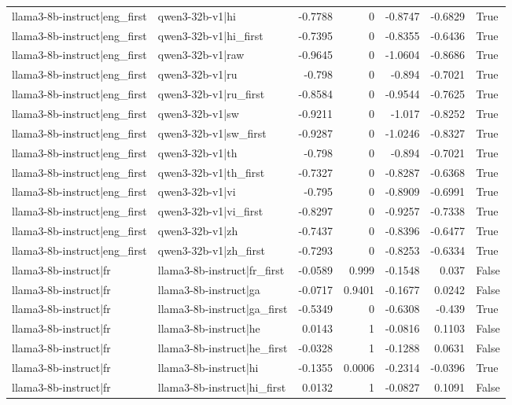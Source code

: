 \begin{table}
\begin{tabular}{l l r r r r l}
llama3-8b-instruct|eng_first & qwen3-32b-v1|hi & -0.7788 & 0 & -0.8747 & -0.6829 & True \\
llama3-8b-instruct|eng_first & qwen3-32b-v1|hi_first & -0.7395 & 0 & -0.8355 & -0.6436 & True \\
llama3-8b-instruct|eng_first & qwen3-32b-v1|raw & -0.9645 & 0 & -1.0604 & -0.8686 & True \\
llama3-8b-instruct|eng_first & qwen3-32b-v1|ru & -0.798 & 0 & -0.894 & -0.7021 & True \\
llama3-8b-instruct|eng_first & qwen3-32b-v1|ru_first & -0.8584 & 0 & -0.9544 & -0.7625 & True \\
llama3-8b-instruct|eng_first & qwen3-32b-v1|sw & -0.9211 & 0 & -1.017 & -0.8252 & True \\
llama3-8b-instruct|eng_first & qwen3-32b-v1|sw_first & -0.9287 & 0 & -1.0246 & -0.8327 & True \\
llama3-8b-instruct|eng_first & qwen3-32b-v1|th & -0.798 & 0 & -0.894 & -0.7021 & True \\
llama3-8b-instruct|eng_first & qwen3-32b-v1|th_first & -0.7327 & 0 & -0.8287 & -0.6368 & True \\
llama3-8b-instruct|eng_first & qwen3-32b-v1|vi & -0.795 & 0 & -0.8909 & -0.6991 & True \\
llama3-8b-instruct|eng_first & qwen3-32b-v1|vi_first & -0.8297 & 0 & -0.9257 & -0.7338 & True \\
llama3-8b-instruct|eng_first & qwen3-32b-v1|zh & -0.7437 & 0 & -0.8396 & -0.6477 & True \\
llama3-8b-instruct|eng_first & qwen3-32b-v1|zh_first & -0.7293 & 0 & -0.8253 & -0.6334 & True \\
llama3-8b-instruct|fr & llama3-8b-instruct|fr_first & -0.0589 & 0.999 & -0.1548 & 0.037 & False \\
llama3-8b-instruct|fr & llama3-8b-instruct|ga & -0.0717 & 0.9401 & -0.1677 & 0.0242 & False \\
llama3-8b-instruct|fr & llama3-8b-instruct|ga_first & -0.5349 & 0 & -0.6308 & -0.439 & True \\
llama3-8b-instruct|fr & llama3-8b-instruct|he & 0.0143 & 1 & -0.0816 & 0.1103 & False \\
llama3-8b-instruct|fr & llama3-8b-instruct|he_first & -0.0328 & 1 & -0.1288 & 0.0631 & False \\
llama3-8b-instruct|fr & llama3-8b-instruct|hi & -0.1355 & 0.0006 & -0.2314 & -0.0396 & True \\
llama3-8b-instruct|fr & llama3-8b-instruct|hi_first & 0.0132 & 1 & -0.0827 & 0.1091 & False \\

\end{tabular}
\end{table}
